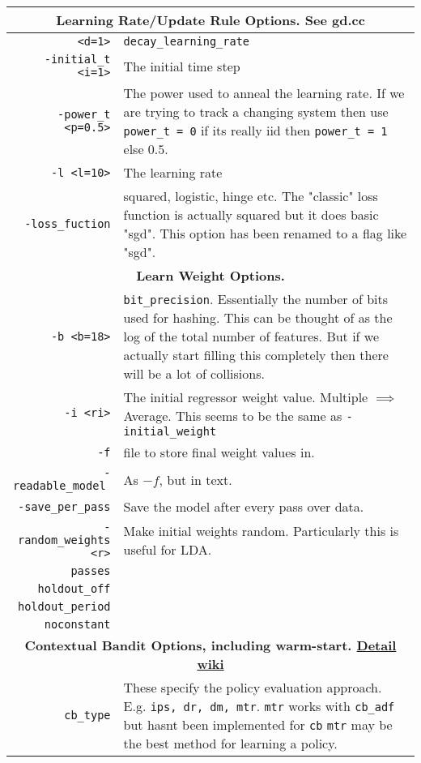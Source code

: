 \documentclass[preview,border={30 30 30 30}]{standalone}
\begin{document}
\begin{tabular}{r|p{8cm}}
    \multicolumn{2}{c}{\textbf{Learning Rate/Update Rule Options. See gd.cc}}\\\hline
    \verb|<d=1>|&\verb|decay_learning_rate|\\
    \verb|-initial_t <i=1>|& The initial time step\\
    \verb|-power_t <p=0.5>|& The power used to anneal the learning rate. If we are trying to track a changing system then use \verb|power_t = 0| if its really iid then \verb|power_t = 1| else $0.5$. \\
    \verb|-l <l=10>|& The learning rate\\ 
    \verb|-loss_fuction|& squared, logistic, hinge etc. The "classic" loss function is actually squared but it does basic "sgd". This option has been renamed to a flag like "sgd". \\\hline
    \multicolumn{2}{c}{\textbf{Learn Weight Options.}}\\\hline
    \verb|-b <b=18>|& \verb|bit_precision|. Essentially the number of bits used for hashing. This can be thought of as the log of the total number of features. But if we actually start filling this completely then there will be a lot of collisions.\\
    \verb|-i <ri>|& The initial regressor  weight value. Multiple $\implies$ Average. This seems to be the same as \verb|-initial_weight|\\
    \verb|-f|& file to store final weight values in.\\
    \verb|-readable_model |& As $-f$, but in text.\\
    \verb|-save_per_pass|& Save the model after every pass over data.\\
    \verb|-random_weights <r>|& Make initial weights random. Particularly this is useful for LDA.\\
    \verb|passes|&\\
    \verb|holdout_off|&\\
    \verb|holdout_period|&\\
    \verb|noconstant|&\\\hline
    \multicolumn{2}{c}{\textbf{Contextual Bandit Options, including warm-start. \href{https://github.com/VowpalWabbit/vowpal_wabbit/wiki/Contextual-Bandit-algorithms}{Detail wiki}}}\\\hline
    \verb|cb_type|&These specify the policy evaluation approach. E.g. \verb|ips, dr, dm, mtr|. \verb|mtr| works with \verb|cb_adf| but hasnt been implemented for \verb|cb| \verb|mtr| may be the best method for learning a policy.\\

\end{tabular}
\end{document}

